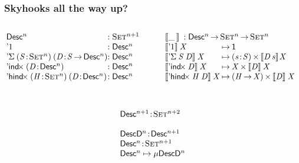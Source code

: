 \documentclass{beamer}
\begin{document}
\begin{frame}

\frametitle{Skyhooks all the way up?}

\begin{columns}
  \begin{column}{6cm}
\[
\begin{array}{@{}l@{}l}
\Desc^n 
    &: \Set^{n+1}\\
\DUnit 
    &: \Desc^{n}\\
\DSigma{(\Bhab{\V{S}}{\Set^{n}})}{(\Bhab{\V{D}}{\V{S} \To \Desc^{n}})} 
    &: \Desc^{n}\\
\DIndx{(\Bhab{\V{D}}{\Desc^{n}})} 
    &: \Desc^{n} \\
\DHindx{(\Bhab{\V{H}}{\Set^n})}{(\Bhab{\V{D}}{\Desc^n})} 
    &: \Desc^n
\end{array}
\]
  \end{column}
  \begin{column}{6cm}
\[
\begin{array}{l@{\:\mapsto\:}l}     
\multicolumn{2}{l}{\descop{\_\:}{} : \Desc^{n} \To \Set^{n} \To \Set^{n}} \\
\descop{\DUnit}{\V{X}} &  
     \Unit \\
\descop{\DSigma{\V{S}}{\V{D}}}{\V{X}} &
     \SIGMAS{\Bhab{\V{s}}{\V{S}}}{\descop{\V{D}\,\V{s}}{\!\V{X}}}  \\
\descop{\DIndx{\V{D}}}{\V{X}}  &  
     \TIMES{\V{X}}{\descop{\V{D}}{\V{X}}} \\
\descop{\DHindx{\V{H}}{\V{D}}}{\V{X}} &
     \TIMES{(\V{H} \To \V{X})}{\descop{\V{D}}{\V{X}}} 
\end{array}
\]
  \end{column}
\end{columns}


\[\stk{
\\
\Bhab{\Desc^{n+1}}{\Set^{n+2}} \\
\\
\Bhab{\DescD^{n}}{\Desc^{n+1}} \\
\Bhab{\Desc^{n}}{\Set^{n+1}} \\
\Desc^{n} \mapsto \Mu{\DescD^{n}}
}\]

\end{frame}

\newcommand{\SYMBDpi}{\etag{\pi}\xspace}
\newcommand{\Dpi}[2]{\SYMBDpi\:#1\:#2}
\end{document}
